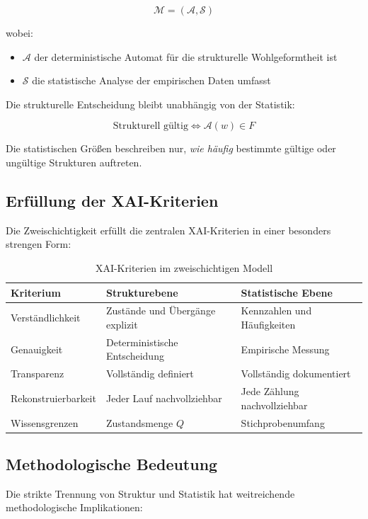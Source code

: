 \documentclass[
  12pt,
  a4paper,
  oneside,
  titlepage
]{article}
\begin{document}
\[
\mathcal{M} = (\mathcal{A}, \mathcal{S})
\]

wobei:
\begin{itemize}
    \item \(\mathcal{A}\) der deterministische Automat für die 
    strukturelle Wohlgeformtheit ist
    \item \(\mathcal{S}\) die statistische Analyse der empirischen 
    Daten umfasst
\end{itemize}

Die strukturelle Entscheidung bleibt unabhängig von der Statistik:

\[
\text{Strukturell gültig} \iff \mathcal{A}(w) \in F
\]

Die statistischen Größen beschreiben nur, \textit{wie häufig} bestimmte 
gültige oder ungültige Strukturen auftreten.

\subsection{Erfüllung der XAI-Kriterien}

Die Zweischichtigkeit erfüllt die zentralen XAI-Kriterien in einer 
besonders strengen Form:

\begin{table}[h]
\centering
\caption{XAI-Kriterien im zweischichtigen Modell}
\label{tab:xai}
\begin{tabular}{@{} p{3cm} p{4cm} p{4cm} @{}}
\toprule
\textbf{Kriterium} & \textbf{Strukturebene} & \textbf{Statistische Ebene} \\
\midrule
Verständlichkeit & Zustände und Übergänge explizit & Kennzahlen und Häufigkeiten \\
Genauigkeit & Deterministische Entscheidung & Empirische Messung \\
Transparenz & Vollständig definiert & Vollständig dokumentiert \\
Rekonstruierbarkeit & Jeder Lauf nachvollziehbar & Jede Zählung nachvollziehbar \\
Wissensgrenzen & Zustandsmenge \(Q\) & Stichprobenumfang \\
\bottomrule
\end{tabular}
\end{table}

\subsection{Methodologische Bedeutung}

Die strikte Trennung von Struktur und Statistik hat weitreichende 
methodologische Implikationen:
\end{document}

